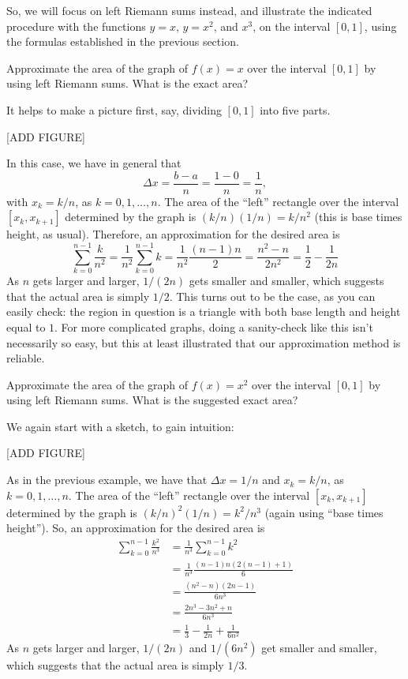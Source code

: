 \documentclass[nooutcomes]{ximera}
\begin{document}
So, we will focus on left Riemann sums instead, and illustrate the indicated procedure with the functions $y=x$, $y=x^2$, and $x^3$, on the interval $[0,1]$, using the formulas established in the previous section.

\begin{example}
  Approximate the area of the graph of $f(x) = x$ over the interval $[0,1]$ by using left Riemann sums. What is the exact area?


  \begin{explanation}
    It helps to make a picture first, say, dividing $[0,1]$ into five parts.

    [ADD FIGURE]

    In this case, we have in general that $$\Delta x = \frac{b-a}{n} = \frac{1-0}{n} = \frac{1}{n},$$with $x_k = k/n$, as $k=0,1,\ldots, n$. The area of the ``left'' rectangle over the interval $[x_k,x_{k+1}]$ determined by the graph is $(k/n)(1/n) = k/n^2$ (this is base times height, as usual). Therefore, an approximation for the desired area is $$\sum_{k=0}^{n-1}\frac{k}{n^2} = \frac{1}{n^2}\sum_{k=0}^{n-1} k = \frac{1}{n^2} \frac{(n-1)n}{2} = \frac{n^2-n}{2n^2} = \frac{1}{2} - \frac{1}{2n}$$
As $n$ gets larger and larger, $1/(2n)$ gets smaller and smaller, which suggests that the actual area is simply $1/2$. This turns out to be the case, as you can easily check: the region in question is a triangle with both base length and height equal to $1$. For more complicated graphs, doing a sanity-check like this isn't necessarily so easy, but this at least illustrated that our approximation method is reliable.    
  \end{explanation}
\end{example}

\begin{example}
  Approximate the area of the graph of $f(x) = x^2$ over the interval $[0,1]$ by using left Riemann sums. What is the suggested exact area?

  \begin{explanation}
    We again start with a sketch, to gain intuition:

    [ADD FIGURE]

    As in the previous example, we have that $\Delta x = 1/n$ and $x_k = k/n$, as $k=0,1,\ldots, n$. The area of the ``left'' rectangle over the interval $[x_k,x_{k+1}]$ determined by the graph is $(k/n)^2(1/n) = k^2/n^3$ (again using ``base times height''). So, an approximation for the desired area is
    \begin{align*}
      \sum_{k=0}^{n-1}\frac{k^2}{n^3} &= \frac{1}{n^3}\sum_{k=0}^{n-1} k^2 \\ &= \frac{1}{n^3} \frac{(n-1)n(2(n-1)+1)}{6} \\ &= \frac{(n^2-n)(2n-1)}{6n^3} \\ &= \frac{2n^3 - 3n^2+n}{6n^3} \\ &= \frac{1}{3} -\frac{1}{2n} + \frac{1}{6n^2}
    \end{align*}
As $n$ gets larger and larger, $1/(2n)$ and $1/(6n^2)$ get smaller and smaller, which suggests that the actual area is simply $1/3$.
  \end{explanation}
\end{example}
\end{document}
